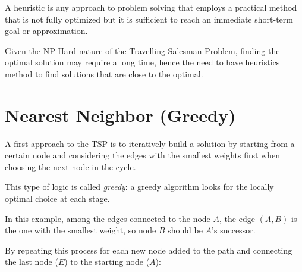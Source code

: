 A heuristic is any approach to problem solving that employs a practical method that is not fully optimized but it is sufficient to reach an immediate short-term goal or approximation.

Given the NP-Hard nature of the Travelling Salesman Problem, finding the optimal solution may require a long time, hence the need to have heuristics method to find solutions that are close to the optimal.

\section{Nearest Neighbor (Greedy)}

A first approach to the TSP is to iteratively build a solution by starting from a certain node and considering the edges with the smallest weights first when choosing the next node in the cycle.

This type of logic is called \textit{greedy}: a greedy algorithm looks for the locally optimal choice at each stage.

\begin{center}
\end{center}

In this example, among the edges connected to the node $A$, the edge $(A, B)$ is the one with the smallest weight, so node $B$ should be $A$'s successor.

By repeating this process for each new node added to the path and connecting the last node ($E$) to the starting node ($A$):

